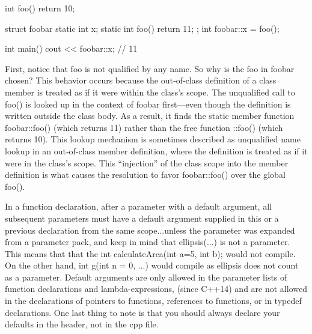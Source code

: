 \documentclass{report}
\begin{document}
    \pagebreak 
    \bigbreak \noindent 
    \begin{cppcode}
        int foo() {
            return 10;
        }

        struct foobar {
            static int x;
            static int foo() {
                return 11;
            }
        };
        int foobar::x = foo();

        int main() {cout << foobar::x; } // 11
    \end{cppcode}
    \bigbreak \noindent 
    First, notice that foo is not qualified by any name. So why is the foo in foobar chosen?
    \bigbreak \noindent 
    This behavior occurs because the out‐of‐class definition of a class member is treated as if it were within the class’s scope.
    \bigbreak \noindent 
    The unqualified call to foo() is looked up in the context of foobar first—even though the definition is written outside the class body. As a result, it finds the static member function foobar::foo() (which returns 11) rather than the free function ::foo() (which returns 10).
    \bigbreak \noindent 
    This lookup mechanism is sometimes described as unqualified name lookup in an out‐of‐class member definition, where the definition is treated as if it were in the class’s scope. This “injection” of the class scope into the member definition is what causes the resolution to favor foobar::foo() over the global foo().

    \pagebreak 
    \bigbreak \noindent 
    In a function declaration, after a parameter with a default argument,
    all subsequent parameters must have a default argument supplied
    in this or a previous declaration from the same scope...unless the
    parameter was expanded from a parameter pack, and keep in mind
    that ellipsis(...) is not a parameter.
    \bigbreak \noindent 
    This means that that the int calculateArea(int a=5, int b);
    would not compile. On the other hand, int g(int n = 0, ...)
    would compile as ellipsis does not count as a parameter.
    \bigbreak \noindent 
    Default arguments are only allowed in the parameter lists of function declarations and lambda-expressions, (since C++14) and are
    not allowed in the declarations of pointers to functions, references
    to functions, or in typedef declarations.
    \bigbreak \noindent 
    One last thing to note is that you should always declare your
    defaults in the header, not in the cpp file.

    \pagebreak 
    \bigbreak \noindent 
\end{document}
